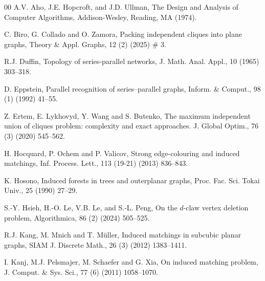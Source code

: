 \documentclass{article}
\newtheorem{conj}[thm]{Conjecture}
\newcommand{\idq}{{}^{\alpha}_{\omega}}
\begin{document}




\begin{thebibliography}{00}
\parskip=-0.05cm
 A.V. Aho, J.E. Hopcroft, and J.D. Ullman, The Design and Analysis of Computer Algorithms, Addison-Wesley, Reading, MA (1974).

 C. Biro, G. Collado and O. Zamora, Packing independent cliques into plane graphs, Theory \& Appl. Graphs, 12 (2) (2025) \# 3.


 R.J. Duffin, Topology of series‐parallel networks, J. Math. Anal. Appl., 10 (1965) 303--318.

 D. Eppstein, Parallel recognition of series–parallel graphs, Inform. \& Comput., 98 (1) (1992) 41--55.

 Z. Ertem, E. Lykhovyd, Y. Wang and S. Butenko, The maximum independent union of cliques problem: complexity and exact approaches. J. Global Optim., 76 (3) (2020) 545--562.

 H. Hocquard, P. Ochem and P. Valicov, Strong edge-colouring and induced matchings, Inf. Process. Lett., 113 (19-21) (2013) 836--843.
 
 K. Hosono, Induced forests in trees and outerplanar graphs, Proc. Fac. Sci. Tokai Univ., 25 (1990) 27--29.

 S.-Y. Hsieh, H.-O. Le, V.B. Le, and S.-L. Peng, On the $d$-claw vertex deletion problem, Algorithmica, 86 (2) (2024) 505--525.

 R.J. Kang, M. Mnich and T. M\"{u}ller, Induced matchings in subcubic planar graphs, SIAM J. Discrete Math., 26 (3) (2012) 1383--1411.

 I. Kanj, M.J. Pelsmajer, M. Schaefer and G. Xia, On induced matching problem, J. Comput. \& Sys. Sci., 77 (6) (2011) 1058--1070.


\end{thebibliography}
\end{document}
